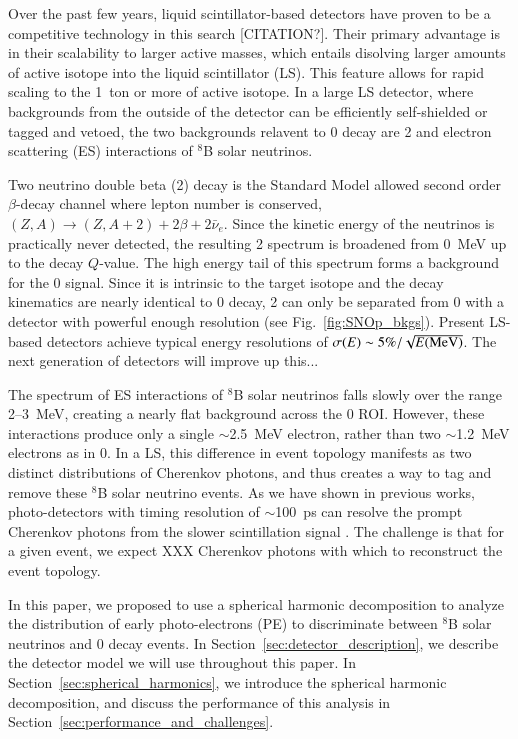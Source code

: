 Over the past few years, liquid scintillator-based detectors have
proven to be a competitive technology in this search
[CITATION?]. Their primary advantage is in their scalability to larger
active masses, which entails disolving larger amounts of active
isotope into the liquid scintillator (LS). This feature allows for
rapid scaling to the 1~ton or more of active isotope. In a large LS
detector, where backgrounds from the outside of the detector can be
efficiently self-shielded or tagged and vetoed, the two backgrounds
relavent to 0{\nbb} decay are 2{\nbb} and electron scattering (ES) interactions of $^{8}$B solar neutrinos.

Two neutrino double beta (2{\nbb}) decay is the Standard Model allowed
second order $\beta$-decay channel where lepton number is conserved,
\mbox{$(Z,A)\rightarrow(Z,A+2)+2\beta+2\bar\nu_e$}. Since the kinetic
energy of the neutrinos is practically never detected, the resulting
2{\nbb} spectrum is broadened from 0~MeV up to the decay
$Q$-value. The high energy tail of this spectrum forms a background
for the 0{\nbb} signal. Since it is intrinsic to the target isotope
and the decay kinematics are nearly identical to 0{\nbb} decay,
2{\nbb} can only be separated from 0{\nbb} with a detector with
powerful enough resolution (see Fig.~\ref{fig:SNOp_bkgs}). Present
LS-based detectors achieve typical energy resolutions of
\mbox{$\sigma(E)\sim 5\%/\sqrt{E(\rm MeV)}$}. The next generation of
detectors will improve up this... 

The spectrum of ES interactions of $^{8}$B solar neutrinos falls
slowly over the range 2--3~MeV, creating a nearly flat background
across the 0{\nbb} ROI. However, these interactions produce only a
single $\sim$2.5~MeV electron, rather than two $\sim$1.2~MeV electrons
as in 0{\nbb}. In a LS, this difference in event topology manifests as
two distinct distributions of Cherenkov photons, and thus creates a
way to tag and remove these $^{8}$B solar neutrino events. As we have
shown in previous works, photo-detectors with timing resolution of
$\sim$100~ps can resolve the prompt Cherenkov photons from the slower
scintillation signal \cite{Aberle2014}. The challenge is that for a
given event, we expect XXX Cherenkov photons with which to reconstruct
the event topology.

In this paper, we proposed to use a spherical harmonic decomposition
to analyze the distribution of early photo-electrons (PE) to
discriminate between $^{8}$B solar neutrinos and 0{\nbb} decay
events. In Section~\ref{sec:detector_description}, we describe the
detector model we will use throughout this paper. In
Section~\ref{sec:spherical_harmonics}, we introduce the spherical
harmonic decomposition, and discuss the performance of this analysis
in Section~\ref{sec:performance_and_challenges}.




